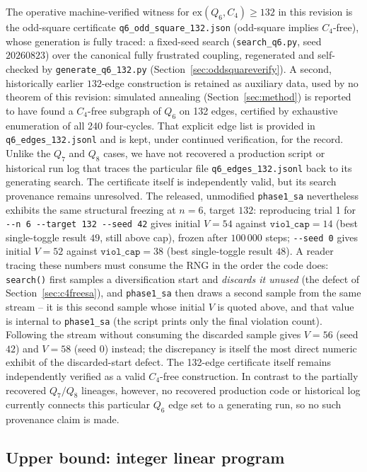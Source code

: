 \documentclass[12pt]{article}
\newcommand{\ex}{\mathrm{ex}}
\begin{document}
The operative machine-verified witness for $\ex(Q_6,C_4)\ge132$ in this
revision is the odd-square certificate \texttt{q6\_odd\_square\_132.json}
(odd-square implies $C_4$-free), whose generation is fully traced: a
fixed-seed search (\texttt{search\_q6.py}, seed $20260823$) over the
canonical fully frustrated coupling, regenerated and self-checked by
\texttt{generate\_q6\_132.py} (Section~\ref{sec:oddsquareverify}). A second,
historically earlier $132$-edge construction is retained as auxiliary data,
used by no theorem of this revision: simulated annealing
(Section~\ref{sec:method}) is reported to have found a $C_4$-free subgraph of
$Q_6$ on 132 edges, certified by exhaustive enumeration of all 240 four-cycles.
That explicit edge list is provided in \texttt{q6\_edges\_132.jsonl} and is
kept, under continued verification, for the record. Unlike the $Q_7$ and $Q_8$ cases, we have not recovered a production script
or historical run log that traces the particular file
\texttt{q6\_edges\_132.jsonl} back to its generating search. The certificate
itself is independently valid, but its search provenance remains unresolved.
The released, unmodified \texttt{phase1\_sa} nevertheless exhibits the same structural
freezing at $n=6$, target $132$: reproducing trial 1 for
\texttt{-{}-n 6 -{}-target 132 -{}-seed 42} gives initial $V=54$
against $\texttt{viol\_cap}=14$ (best single-toggle result $49$, still
above cap), frozen after $100\,000$ steps; \texttt{-{}-seed 0} gives
initial $V=52$ against $\texttt{viol\_cap}=38$ (best single-toggle
result $48$). A reader tracing these numbers must consume the RNG in the
order the code does: \texttt{search()} first samples a diversification start
and \emph{discards it unused} (the defect of Section~\ref{sec:c4freesa}),
and \texttt{phase1\_sa} then draws a second sample from the same stream --
it is this second sample whose initial $V$ is quoted above, and that value is
internal to \texttt{phase1\_sa} (the script prints only the final violation
count). Following the stream without consuming the discarded sample gives
$V=56$ (seed $42$) and $V=58$ (seed $0$) instead; the discrepancy is itself
the most direct numeric exhibit of the discarded-start defect. The 132-edge certificate itself remains independently verified as a valid
$C_4$-free construction. In contrast to the partially recovered $Q_7/Q_8$
lineages, however, no recovered production code or historical log currently
connects this particular $Q_6$ edge set to a generating run, so no such
provenance claim is made.

\subsection{Upper bound: integer linear program}\label{sec:q6upper}
\end{document}
